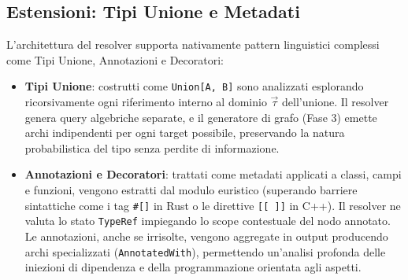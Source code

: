 \subsection{Estensioni: Tipi Unione e Metadati}
L'architettura del resolver supporta nativamente pattern linguistici complessi come Tipi Unione, Annotazioni e Decoratori:
\begin{itemize}
    \item \textbf{Tipi Unione}: costrutti come \texttt{Union[A, B]} sono analizzati esplorando ricorsivamente ogni riferimento interno al dominio $\vec{\tau}$ dell'unione. Il resolver genera query algebriche separate, e il generatore di grafo (Fase 3) emette archi indipendenti per ogni target possibile, preservando la natura probabilistica del tipo senza perdite di informazione.
    \item \textbf{Annotazioni e Decoratori}: trattati come metadati applicati a classi, campi e funzioni, vengono estratti dal modulo euristico (superando barriere sintattiche come i tag \texttt{\#[]} in Rust o le direttive \texttt{[[ ]]} in C++). Il resolver ne valuta lo stato \texttt{TypeRef} impiegando lo scope contestuale del nodo annotato. Le annotazioni, anche se irrisolte, vengono aggregate in output producendo archi specializzati (\texttt{AnnotatedWith}), permettendo un'analisi profonda delle iniezioni di dipendenza e della programmazione orientata agli aspetti.
\end{itemize}
